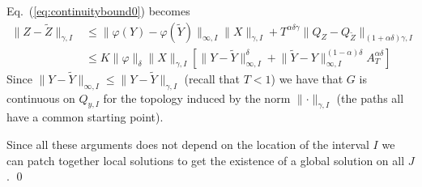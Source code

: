 \documentclass[a4paper,12pt,reqno]{amsproc}
\newcommand{\norm}[1]{\lVert #1\rVert}
\newcommand{\wt}{\widetilde}
\begin{document}
Eq.~(\ref{eq:continuitybound0}) becomes
\begin{equation*}
  \begin{split}
\norm{Z-\wt Z}_{\gamma,I} & \le \norm{\varphi(Y)-\varphi(\wt
  Y)}_{\infty,I}
\norm{X}_{\gamma,I} + T^{\alpha\delta \gamma}\norm{Q_Z-Q_{\wt Z}}_{(1+\alpha\delta)\gamma,I}    
\\ &  \le K \norm{\varphi}_\delta  \norm{X}_{\gamma,I} \left[ \norm{Y-\wt
  Y}_{\infty,I}^\delta
 + 
 \norm{\wt Y - Y}_{\infty,I}^{(1-\alpha)\delta}
  A_T^{\alpha \delta} \right]
  \end{split}
\end{equation*}
Since $\norm{Y-\wt Y}_{\infty,I} \le \norm{Y-\wt Y}_{\gamma,I}$
(recall that $T < 1$) we have that $G$ is continuous on $Q_{y,I}$ for
the topology induced by the norm $\norm{\cdot}_{\gamma,I}$ (the paths
all have  a common starting point).
 
Since all these arguments does not
depend on the location of the interval $I$  we can patch together
local solutions to get the existence of a global solution on all $J$. 
\qed
\end{document}
